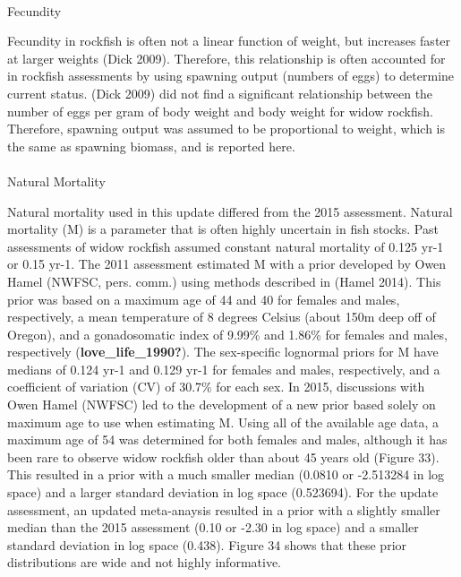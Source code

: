 \documentclass[
]{scrartcl}
\makeatletter
\let\oldparagraph\paragraph
\renewcommand{\paragraph}{
    \@ifstar
      \xxxParagraphStar
      \xxxParagraphNoStar
  }
\newcommand{\xxxParagraphStar}[1]{\oldparagraph*{#1}\mbox{}}
\newcommand{\xxxParagraphNoStar}[1]{\oldparagraph{#1}\mbox{}}
\makeatother
\begin{document}
\paragraph{Fecundity}\label{fecundity}

Fecundity in rockfish is often not a linear function of weight, but
increases faster at larger weights (Dick 2009). Therefore, this
relationship is often accounted for in rockfish assessments by using
spawning output (numbers of eggs) to determine current status. (Dick
2009) did not find a significant relationship between the number of eggs
per gram of body weight and body weight for widow rockfish. Therefore,
spawning output was assumed to be proportional to weight, which is the
same as spawning biomass, and is reported here.

\paragraph{Natural Mortality}\label{natural-mortality}

Natural mortality used in this update differed from the 2015 assessment.
Natural mortality (M) is a parameter that is often highly uncertain in
fish stocks. Past assessments of widow rockfish assumed constant natural
mortality of 0.125 yr-1 or 0.15 yr-1. The 2011 assessment estimated M
with a prior developed by Owen Hamel (NWFSC, pers. comm.) using methods
described in (Hamel 2014). This prior was based on a maximum age of 44
and 40 for females and males, respectively, a mean temperature of 8
degrees Celsius (about 150m deep off of Oregon), and a gonadosomatic
index of 9.99\% and 1.86\% for females and males, respectively
(\textbf{love\_life\_1990?}). The sex-specific lognormal priors for M
have medians of 0.124 yr-1 and 0.129 yr-1 for females and males,
respectively, and a coefficient of variation (CV) of 30.7\% for each
sex. In 2015, discussions with Owen Hamel (NWFSC) led to the development
of a new prior based solely on maximum age to use when estimating M.
Using all of the available age data, a maximum age of 54 was determined
for both females and males, although it has been rare to observe widow
rockfish older than about 45 years old (Figure 33). This resulted in a
prior with a much smaller median (0.0810 or -2.513284 in log space) and
a larger standard deviation in log space (0.523694). For the update
assessment, an updated meta-anaysis resulted in a prior with a slightly
smaller median than the 2015 assessment (0.10 or -2.30 in log space) and
a smaller standard deviation in log space (0.438). Figure 34 shows that
these prior distributions are wide and not highly informative.
\end{document}
